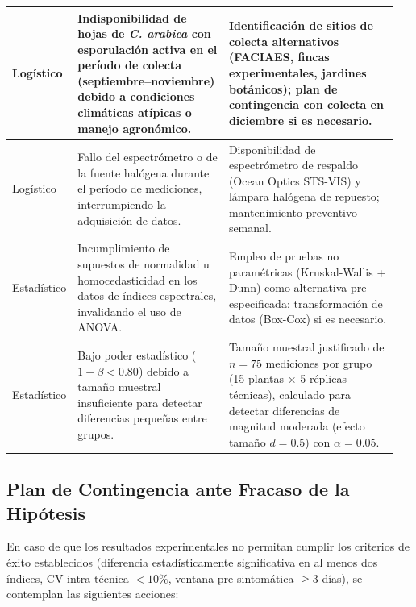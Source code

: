 \documentclass[12pt, a4paper]{article}
\begin{document}
\begin{table}
\begin{tabular}{p{0.1\linewidth}p{0.4\linewidth}p{0.45\linewidth}}
			\midrule
			Logístico & Indisponibilidad de hojas de \textit{C. arabica} con esporulación activa en el período de colecta (septiembre--noviembre) debido a condiciones climáticas atípicas o manejo agronómico. & Identificación de sitios de colecta alternativos (FACIAES, fincas experimentales, jardines botánicos); plan de contingencia con colecta en diciembre si es necesario. \\
			\midrule
			Logístico & Fallo del espectrómetro o de la fuente halógena durante el período de mediciones, interrumpiendo la adquisición de datos. & Disponibilidad de espectrómetro de respaldo (Ocean Optics STS-VIS) y lámpara halógena de repuesto; mantenimiento preventivo semanal. \\
			\midrule
			Estadístico & Incumplimiento de supuestos de normalidad u homocedasticidad en los datos de índices espectrales, invalidando el uso de ANOVA. & Empleo de pruebas no paramétricas (Kruskal-Wallis + Dunn) como alternativa pre-especificada; transformación de datos (Box-Cox) si es necesario. \\
			\midrule
			Estadístico & Bajo poder estadístico ($1-\beta < 0.80$) debido a tamaño muestral insuficiente para detectar diferencias pequeñas entre grupos. & Tamaño muestral justificado de $n=75$ mediciones por grupo (15 plantas × 5 réplicas técnicas), calculado para detectar diferencias de magnitud moderada (efecto tamaño $d=0.5$) con $\alpha=0.05$. \\
			\bottomrule
		\end{tabular}
	\end{table}
	
	\subsection{Plan de Contingencia ante Fracaso de la Hipótesis}
	
	En caso de que los resultados experimentales no permitan cumplir los criterios de éxito establecidos (diferencia estadísticamente significativa en al menos dos índices, CV intra-técnica $<10\%$, ventana pre-sintomática $\geq 3$ días), se contemplan las siguientes acciones:
	
\end{document}
